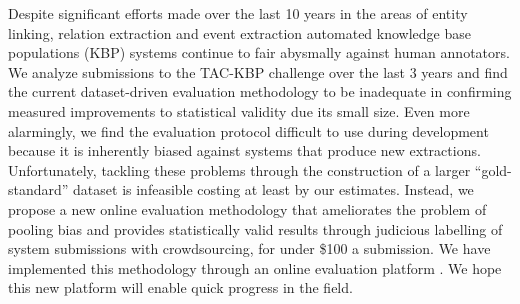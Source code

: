 Despite significant efforts made over the last 10 years in the areas of entity linking, relation extraction and event extraction automated knowledge base populations (KBP) systems continue to fair abysmally against human annotators.
We analyze submissions to the TAC-KBP challenge over the last 3 years and find the current dataset-driven evaluation methodology to be inadequate in confirming measured improvements to statistical validity due its small size.
Even more alarmingly, we find the evaluation protocol difficult to use during development because it is inherently biased against systems that produce new extractions. %
Unfortunately, tackling these problems through the construction of a larger ``gold-standard'' dataset is infeasible costing at least  by our estimates.
Instead, we propose a new online evaluation methodology that ameliorates the problem of pooling bias and provides statistically valid results through judicious labelling of system submissions with crowdsourcing, for under \$100 a submission.
We have implemented this methodology through an online evaluation platform .
We hope this new platform will enable quick progress in the field.
